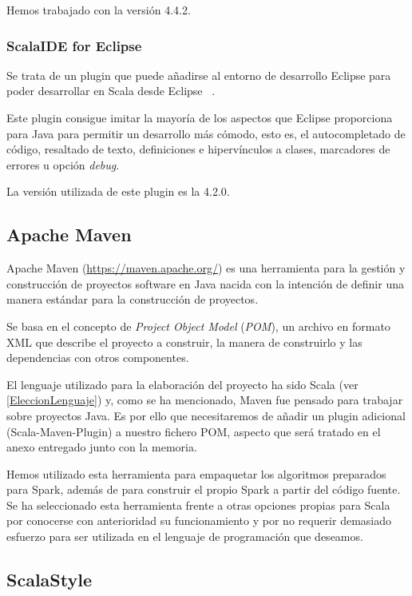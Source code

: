 Hemos trabajado con la versión 4.4.2.

\subsubsection{ScalaIDE for Eclipse}

Se trata de un plugin que puede añadirse al entorno de desarrollo Eclipse para poder desarrollar en Scala desde Eclipse~\cite{ScalaIDEPage} .

Este plugin consigue imitar la mayoría de los aspectos que Eclipse proporciona para Java para permitir un desarrollo más cómodo, esto es, el autocompletado de código, resaltado de texto, definiciones e hipervínculos a clases, marcadores de errores u opción \textit{debug}.

La versión utilizada de este plugin es la 4.2.0.

\subsection{Apache Maven}

Apache Maven (\url{https://maven.apache.org/}) es una herramienta para la gestión y construcción de proyectos software en Java nacida con la intención de definir una manera estándar para la construcción de proyectos.

Se basa en el concepto de \textit{Project Object Model} (\textit{POM}), un archivo en formato XML que describe el proyecto a construir, la manera de construirlo y  las dependencias con otros componentes.

El lenguaje utilizado para la elaboración del proyecto ha sido Scala (ver \ref{EleccionLenguaje}) y, como se ha mencionado, Maven fue pensado para trabajar sobre proyectos Java. Es por ello que necesitaremos de añadir un plugin adicional (Scala-Maven-Plugin) a nuestro fichero POM, aspecto que será tratado en el anexo entregado junto con la memoria.

Hemos utilizado esta herramienta para empaquetar los algoritmos preparados para Spark, además de para construir el propio Spark a partir del código fuente. Se ha seleccionado esta herramienta frente a otras opciones propias para Scala por conocerse con anterioridad su funcionamiento y por no requerir demasiado esfuerzo para ser utilizada en el lenguaje de programación que deseamos.

\subsection{ScalaStyle}

